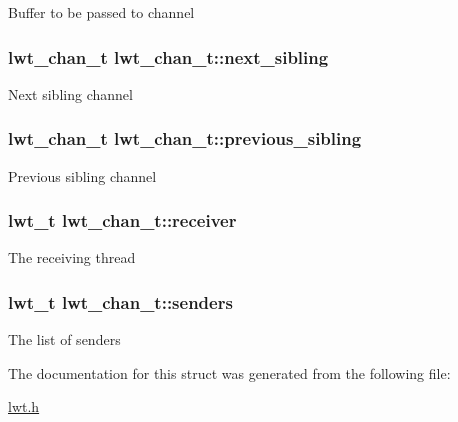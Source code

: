 Buffer to be passed to channel \hypertarget{structlwt__channel_a4b5e95b483446613dabd96de3dec4007}{
\subsubsection[{next\+\_\+sibling}]{\setlength{\rightskip}{0pt plus 5cm}lwt\+\_\+chan\+\_\+t lwt\+\_\+chan\+\_\+t\+::next\+\_\+sibling}}\label{structlwt__channel_a4b5e95b483446613dabd96de3dec4007}
Next sibling channel \hypertarget{structlwt__channel_a62840bc52e01e67e063776f8205dd43e}{
\subsubsection[{previous\+\_\+sibling}]{\setlength{\rightskip}{0pt plus 5cm}lwt\+\_\+chan\+\_\+t lwt\+\_\+chan\+\_\+t\+::previous\+\_\+sibling}}\label{structlwt__channel_a62840bc52e01e67e063776f8205dd43e}
Previous sibling channel \hypertarget{structlwt__channel_a740680d836200bfc87150333e4d62785}{
\subsubsection[{receiver}]{\setlength{\rightskip}{0pt plus 5cm}lwt\+\_\+t lwt\+\_\+chan\+\_\+t\+::receiver}}\label{structlwt__channel_a740680d836200bfc87150333e4d62785}
The receiving thread \hypertarget{structlwt__channel_a20bba68264c7fd15c6efb8446821d16e}{
\subsubsection[{senders}]{\setlength{\rightskip}{0pt plus 5cm}lwt\+\_\+t lwt\+\_\+chan\+\_\+t\+::senders}}\label{structlwt__channel_a20bba68264c7fd15c6efb8446821d16e}
The list of senders 

The documentation for this struct was generated from the following file\+:\begin{DoxyCompactItemize}
\item 
\hyperlink{lwt_8h}{lwt.\+h}\end{DoxyCompactItemize}
